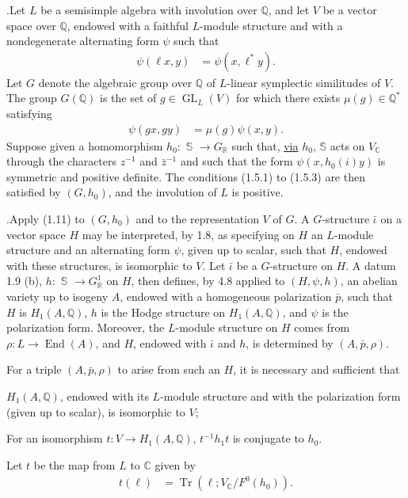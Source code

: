 \documentclass[10pt]{article}
\newcommand{\C}{\mathbb C}
\newcommand{\Q}{\mathbb Q}
\newcommand{\R}{\mathbb R}
\newcommand{\bS}{\mathbb S}
\newcommand{\GL}{\operatorname{GL}}
\newcommand{\End}{\operatorname{End}}
\newcommand{\Tr}{\operatorname{Tr}}
\begin{document}
.\quad Let $L$ be a semisimple algebra with involution over $\Q$, and let $V$ be a vector space over $\Q$, endowed with a faithful $L$-module structure and with a nondegenerate alternating form $\psi$ such that
\begingroup
\makeatletter
\tagsleft@true
\makeatother
\begin{align}
\psi(\ell x,y)&=\psi(x,\ell^*y).\tag{4.9.1}
\end{align}
Let $G$ denote the algebraic group over $\Q$ of $L$-linear symplectic similitudes of $V$. The group $G(\Q)$ is the set of $g\in\GL_L(V)$ for which there exists $\mu(g)\in\Q^*$ satisfying
\begin{align}
\psi(gx,gy)&=\mu(g)\psi(x,y).\tag{4.9.2}
\end{align}
\endgroup
Suppose given a homomorphism $h_0:$ \uline{$\bS$} $\longrightarrow G_\R$ such that, \uline{via} $h_0$, \uline{$\bS$} acts on $V_\C$ through the characters $z^{-1}$ and $\bar z^{-1}$ and such that the form $\psi(x,h_0(i)y)$ is symmetric and positive definite. The conditions (1.5.1) to (1.5.3) are then satisfied by $(G,h_0)$, and the involution of $L$ is positive.

.\quad Apply (1.11) to $(G,h_0)$ and to the representation $V$ of $G$. A $G$-structure $\bar\iota$ on a vector space $H$ may be interpreted, by 1.8, as specifying on $H$ an $L$-module structure and an alternating form $\psi$, given up to scalar, such that $H$, endowed with these structures, is isomorphic to $V$. Let $\bar\iota$ be a $G$-structure on $H$. A datum 1.9 (b), $h:$ \uline{$\bS$} $\longrightarrow G^1_\R$ on $H$, then defines, by 4.8 applied to $(H,\psi,h)$, an abelian variety up to isogeny $A$, endowed with a homogeneous polarization $\bar p$, such that $H$ is $H_1(A,\Q)$, $h$ is the Hodge structure on $H_1(A,\Q)$, and $\psi$ is the polarization form. Moreover, the $L$-module structure on $H$ comes from $\rho:L\longrightarrow\End(A)$, and $H$, endowed with $\bar\iota$ and $h$, is determined by $(A,\bar p,\rho)$.

For a triple $(A,\bar p,\rho)$ to arise from such an $H$, it is necessary and sufficient that
\begin{list}{}{\setlength{\leftmargin}{6.4em}\setlength{\labelwidth}{5.4em}\setlength{\labelsep}{1em}\setlength{\topsep}{.4em}\setlength{\itemsep}{0pt}}
\item[(4.10.1)] $H_1(A,\Q)$, endowed with its $L$-module structure and with the polarization form (given up to scalar), is isomorphic to $V$;
\end{list}
\begin{list}{}{\setlength{\leftmargin}{6.4em}\setlength{\labelwidth}{5.4em}\setlength{\labelsep}{1em}\setlength{\topsep}{.4em}\setlength{\itemsep}{0pt}}
\item[(4.10.2)] For an isomorphism $t:V\longrightarrow H_1(A,\Q)$, $t^{-1}h_1t$ is conjugate to $h_0$.
\end{list}
Let $t$ be the map from $L$ to $\C$ given by
\begingroup
\makeatletter
\tagsleft@true
\makeatother
\begin{align}
t(\ell)&=\Tr(\ell;V_\C/F^0(h_0)).\tag{4.10.3}
\end{align}
\endgroup
\end{document}
